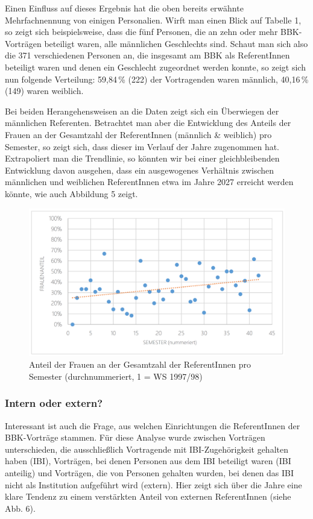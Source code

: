 \documentclass[a4paper,
fontsize=11pt,
oneside,
numbers=noperiodatend,
parskip=half-,
bibliography=totoc,
final
]{scrartcl}
\begin{document}
Einen Einfluss auf dieses Ergebnis hat die oben bereits erwähnte
Mehrfachnennung von einigen Personalien. Wirft man einen Blick auf
Tabelle 1, so zeigt sich beispielsweise, dass die fünf Personen, die an
zehn oder mehr BBK-Vorträgen beteiligt waren, alle männlichen
Geschlechts sind. Schaut man sich also die 371 verschiedenen Personen
an, die insgesamt am BBK als ReferentInnen beteiligt waren und denen ein
Geschlecht zugeordnet werden konnte, so zeigt sich nun folgende
Verteilung: 59,84\,\% (222) der Vortragenden waren männlich, 40,16\,\%
(149) waren weiblich.

Bei beiden Herangehensweisen an die Daten zeigt sich ein Überwiegen der
männlichen Referenten. Betrachtet man aber die Entwicklung des Anteils
der Frauen an der Gesamtzahl der ReferentInnen (männlich \& weiblich)
pro Semester, so zeigt sich, dass dieser im Verlauf der Jahre zugenommen
hat. Extrapoliert man die Trendlinie, so könnten wir bei einer
gleichbleibenden Entwicklung davon ausgehen, dass ein ausgewogenes
Verhältnis zwischen männlichen und weiblichen ReferentInnen etwa im
Jahre 2027 erreicht werden könnte, wie auch Abbildung 5 zeigt.

\begin{figure}
\centering
\includegraphics[width=12cm]{img/Abbildung5.png}
\caption{Anteil der Frauen an der Gesamtzahl der ReferentInnen pro
Semester (durchnummeriert, 1 = WS 1997/98)}
\end{figure}

\hypertarget{intern-oder-extern}{%
\subsubsection{Intern oder extern?}\label{intern-oder-extern}}

Interessant ist auch die Frage, aus welchen Einrichtungen die
ReferentInnen der BBK-Vorträge stammen. Für diese Analyse wurde zwischen
Vorträgen unterschieden, die ausschließlich Vortragende mit
IBI-Zugehörigkeit gehalten haben (IBI), Vorträgen, bei denen Personen
aus dem IBI beteiligt waren (IBI anteilig) und Vorträgen, die von
Personen gehalten wurden, bei denen das IBI nicht als Institution
aufgeführt wird (extern). Hier zeigt sich über die Jahre eine klare
Tendenz zu einem verstärkten Anteil von externen ReferentInnen (siehe
Abb. 6).
\end{document}
